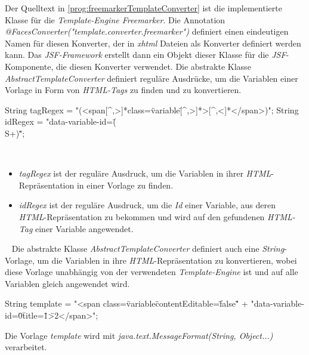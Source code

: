 Der Quelltext in \ref{prog:freemarkerTemplateConverter} ist die implementierte Klasse für die \emph{Template-Engine Freemarker}. Die Annotation \emph{@FacesConverter("template.converter.freemarker")} definiert einen eindeutigen Namen für diesen Konverter, der in \emph{xhtml} Dateien als Konverter definiert werden kann. Das \emph{JSF-Framework} erstellt dann ein Objekt dieser Klasse für die \emph{JSF}-Komponente, die diesen Konverter verwendet. 
\newline
\newline
Die abstrakte Klasse \emph{AbstractTemplateConverter} definiert reguläre Ausdrücke, um die Variablen einer Vorlage in Form von \emph{HTML-Tags} zu finden und zu konvertieren.
\begin{JavaCode}
String tagRegex = "(<span[^,>]*class=\"variable\"[^,>]*>[^,<]*</span>)";
String idRegex = "data-variable-id=\"(\\S+)\"";
\end{JavaCode}
\ \begin{itemize}
	\item\emph{tagRegex} ist der reguläre Ausdruck, um die Variablen in ihrer \emph{HTML}-Repräsentation in einer Vorlage zu finden.
	\item\emph{idRegex} ist der reguläre Ausdruck, um die \emph{Id} einer Variable, aus deren \emph{HTML}-Repräsentation zu bekommen und wird auf den gefundenen \emph{HTML-Tag} einer Variable angewendet.
\end{itemize}
\ \newline
Die abstrakte Klasse \emph{AbstractTemplateConverter} definiert auch eine \emph{String}-Vorlage, um die Variablen in ihre \emph{HTML}-Repräsentation zu konvertieren, wobei diese Vorlage unabhängig von der verwendeten \emph{Template-Engine} ist und auf alle Variablen gleich angewendet wird.
\begin{JavaCode}
String template = "<span class=\"variable\" contentEditable=\"false\" "
                + "data-variable-id=\"{0}\" title=\"{1}\">{2}</span>";
\end{JavaCode}
Die Vorlage \emph{template} wird mit \emph{java.text.MessageFormat(String, Object...)} verarbeitet.

